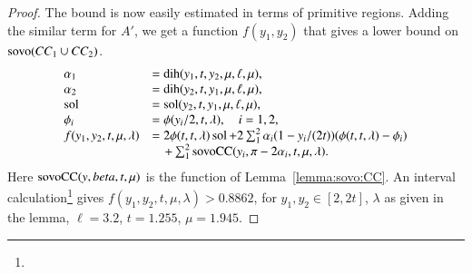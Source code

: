 \begin{proof}
The bound is now easily estimated in terms of primitive
regions.  Adding the similar
term for $A'$, we get
a function $f(y_1,y_2)$ that gives a lower bound on 
${\operatorname{sovo}}(CC_1\cup CC_2)$.  
    $$
    \begin{array}{lll}
    \alpha_1 &= \operatorname{dih}(y_1,t,y_2,\mu,\ell,\mu),\\
    \alpha_2 &= \operatorname{dih}(y_2,t,y_1,\mu,\ell,\mu),\\
    \operatorname{sol} &= \operatorname{sol}(y_2,t,y_1,\mu,\ell,\mu),\\
    \phi_i &= \phi(y_i/2,t,\lambda),\quad i=1,2,\\
    f(y_1,y_2,t,\mu,\lambda)&=
    2\phi(t,t,\lambda)\operatorname{sol}+
    2\sum_1^2 \alpha_i(1-y_i/(2t))(\phi(t,t,\lambda)-\phi_i)\\
        &\quad +
       \sum_1^2 {\operatorname{sovoCC}}(y_i,\pi-2\alpha_i,t,\mu,\lambda).
    \end{array}
    $$
Here ${\operatorname{sovoCC}}(y,beta,t,\mu)$ is the function
of Lemma~\ref{lemma:sovo:CC}.
An interval calculation\footnote{} %
gives $f(y_1,y_2,t,\mu,\lambda)>0.8862$, for $y_1,y_2\in[2,2t]$,
$\lambda$ as given in the lemma, $\ell=3.2$, $t=1.255$, $\mu=1.945$.%
\end{proof}








